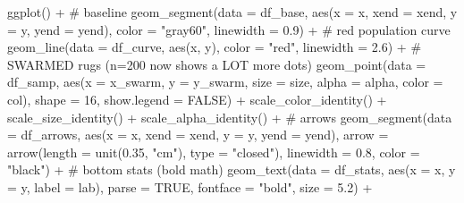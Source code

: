 \documentclass[
  letterpaper,
  DIV=11,
  numbers=noendperiod]{scrreprt}
\newenvironment{Shaded}{\begin{snugshade}}{\end{snugshade}}
\newcommand{\AttributeTok}[1]{\textcolor[rgb]{0.40,0.45,0.13}{#1}}
\newcommand{\CommentTok}[1]{\textcolor[rgb]{0.37,0.37,0.37}{#1}}
\newcommand{\ConstantTok}[1]{\textcolor[rgb]{0.56,0.35,0.01}{#1}}
\newcommand{\DecValTok}[1]{\textcolor[rgb]{0.68,0.00,0.00}{#1}}
\newcommand{\FloatTok}[1]{\textcolor[rgb]{0.68,0.00,0.00}{#1}}
\newcommand{\FunctionTok}[1]{\textcolor[rgb]{0.28,0.35,0.67}{#1}}
\newcommand{\NormalTok}[1]{\textcolor[rgb]{0.00,0.23,0.31}{#1}}
\newcommand{\SpecialCharTok}[1]{\textcolor[rgb]{0.37,0.37,0.37}{#1}}
\newcommand{\StringTok}[1]{\textcolor[rgb]{0.13,0.47,0.30}{#1}}
\begin{document}
\begin{Shaded}
\begin{Highlighting}[]
\FunctionTok{ggplot}\NormalTok{() }\SpecialCharTok{+}
  \CommentTok{\# baseline}
  \FunctionTok{geom\_segment}\NormalTok{(}\AttributeTok{data =}\NormalTok{ df\_base,}
               \FunctionTok{aes}\NormalTok{(}\AttributeTok{x =}\NormalTok{ x, }\AttributeTok{xend =}\NormalTok{ xend, }\AttributeTok{y =}\NormalTok{ y, }\AttributeTok{yend =}\NormalTok{ yend),}
               \AttributeTok{color =} \StringTok{"gray60"}\NormalTok{, }\AttributeTok{linewidth =} \FloatTok{0.9}\NormalTok{) }\SpecialCharTok{+}
  \CommentTok{\# red population curve}
  \FunctionTok{geom\_line}\NormalTok{(}\AttributeTok{data =}\NormalTok{ df\_curve, }\FunctionTok{aes}\NormalTok{(x, y), }\AttributeTok{color =} \StringTok{"red"}\NormalTok{, }\AttributeTok{linewidth =} \FloatTok{2.6}\NormalTok{) }\SpecialCharTok{+}
  \CommentTok{\# SWARMED rugs (n=200 now shows a LOT more dots)}
  \FunctionTok{geom\_point}\NormalTok{(}\AttributeTok{data =}\NormalTok{ df\_samp,}
             \FunctionTok{aes}\NormalTok{(}\AttributeTok{x =}\NormalTok{ x\_swarm, }\AttributeTok{y =}\NormalTok{ y\_swarm, }\AttributeTok{size =}\NormalTok{ size, }\AttributeTok{alpha =}\NormalTok{ alpha, }\AttributeTok{color =}\NormalTok{ col),}
             \AttributeTok{shape =} \DecValTok{16}\NormalTok{, }\AttributeTok{show.legend =} \ConstantTok{FALSE}\NormalTok{) }\SpecialCharTok{+}
  \FunctionTok{scale\_color\_identity}\NormalTok{() }\SpecialCharTok{+}
  \FunctionTok{scale\_size\_identity}\NormalTok{() }\SpecialCharTok{+}
  \FunctionTok{scale\_alpha\_identity}\NormalTok{() }\SpecialCharTok{+}
  \CommentTok{\# arrows}
  \FunctionTok{geom\_segment}\NormalTok{(}\AttributeTok{data =}\NormalTok{ df\_arrows,}
               \FunctionTok{aes}\NormalTok{(}\AttributeTok{x =}\NormalTok{ x, }\AttributeTok{xend =}\NormalTok{ xend, }\AttributeTok{y =}\NormalTok{ y, }\AttributeTok{yend =}\NormalTok{ yend),}
               \AttributeTok{arrow =} \FunctionTok{arrow}\NormalTok{(}\AttributeTok{length =} \FunctionTok{unit}\NormalTok{(}\FloatTok{0.35}\NormalTok{, }\StringTok{"cm"}\NormalTok{), }\AttributeTok{type =} \StringTok{"closed"}\NormalTok{),}
               \AttributeTok{linewidth =} \FloatTok{0.8}\NormalTok{, }\AttributeTok{color =} \StringTok{"black"}\NormalTok{) }\SpecialCharTok{+}
  \CommentTok{\# bottom stats (bold math)}
  \FunctionTok{geom\_text}\NormalTok{(}\AttributeTok{data =}\NormalTok{ df\_stats,}
            \FunctionTok{aes}\NormalTok{(}\AttributeTok{x =}\NormalTok{ x, }\AttributeTok{y =}\NormalTok{ y, }\AttributeTok{label =}\NormalTok{ lab),}
            \AttributeTok{parse =} \ConstantTok{TRUE}\NormalTok{, }\AttributeTok{fontface =} \StringTok{"bold"}\NormalTok{, }\AttributeTok{size =} \FloatTok{5.2}\NormalTok{) }\SpecialCharTok{+}

\end{Highlighting}
\end{Shaded}
\end{document}
